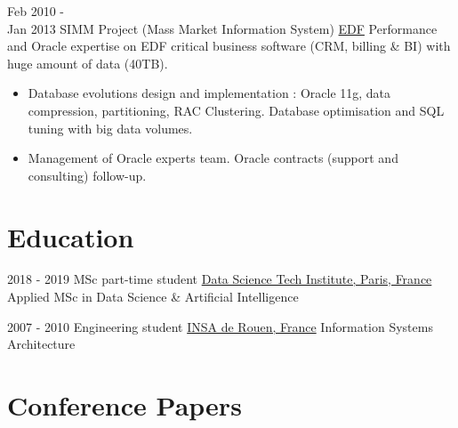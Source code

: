 \documentclass[letterpaper]{twentysecondcv} %
\begin{document}
\begin{twenty}
    \twentyitem
   	{Feb 2010 - \\ Jan 2013}
        {SIMM Project (Mass Market Information System)}
        {\href{http://www.edf.fr/}{EDF}}
        {Performance and Oracle expertise on EDF critical business software (CRM, billing \& BI) with huge amount of data (40TB).}
        {
        {\begin{itemize}
        \item Database evolutions design and implementation : Oracle 11g, data compression, partitioning, RAC Clustering. Database optimisation and SQL tuning with big data volumes.
        \item Management of Oracle experts team. Oracle contracts (support and consulting) follow-up.
    \end{itemize}}
        }


\end{twenty}

\section{Education}

\begin{twenty} %
	\twentyitem
    	{2018 - 2019}
        {MSc part-time student}
        {\href{http://www.datasciencetech.institute/}{Data Science Tech Institute, Paris, France}}
        {}
        {Applied MSc in Data Science \& Artificial Intelligence}
\end{twenty}

\begin{twenty} %
        \twentyitem
        {2007 - 2010}
        {Engineering student}
        {\href{http://www.insa-rouen.fr/}{INSA de Rouen, France}}
        {}
        {Information Systems Architecture}
\end{twenty}

\section{Conference Papers}
\end{document}
